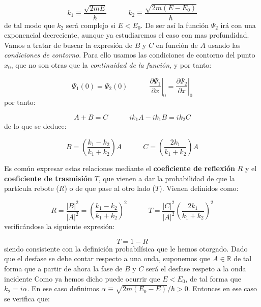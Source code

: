 \documentclass[12pt,a4paper]{article}
\numberwithin{equation}{section}
\numberwithin{figure}{section}
\newcommand{\parentesis}[1]{\left( #1  \right)}
\newcommand{\parciales}[2]{\frac{\partial #1}{\partial #2}}
\newcommand{\tquad}{\quad \quad \quad}
\begin{document}
\begin{equation}
k_1 \equiv \dfrac{\sqrt{2mE}}{\hbar} \tquad k_2 \equiv \dfrac{\sqrt{2m(E-E_0)}}{\hbar}
\end{equation}
de tal modo que $k_2$ será complejo si $E<E_0$. De ser así la función $\Psi_2$ irá con una exponencial decreciente, aunque ya estudiaremos el caso con mas profundidad. Vamos a tratar de buscar la expresión de $B$ y $C$ en función de $A$ usando las \textit{condiciones de contorno}. Para ello usamos las condiciones de contorno del punto $x_0$, que no son otras que la \textit{continuidad de la función}, y por tanto:

\begin{equation}
\Psi_1 (0) = \Psi_2 (0) \tquad \left. \parciales{\Psi_1}{x} \right|_0 = \left. \parciales{\Psi_2}{x} \right|_0
\end{equation}
por tanto:

\begin{equation}
A + B = C \tquad i k_1 A - i k_1 B = i k_2 C
\end{equation}
de lo que se deduce:

\begin{equation}
B = \parentesis{\dfrac{k_1-k_2}{k_1+k_2}}A \tquad C =  \parentesis{\dfrac{2k_1}{k_1+k_2}}A
\end{equation}


Es común expresar estas relaciones mediante el \textbf{coeficiente de reflexión} $R$  y el \textbf{coeficiente de trasmisión}  $T$, que vienen a dar la probabilidad de que la partícula rebote ($R$) o de que pase al otro lado ($T$). Vienen definidos como:

\begin{equation}
R = \dfrac{|B|^2}{|A|^2} = \parentesis{\dfrac{k_1-k_2}{k_1 + k_2}}^2 \tquad T = \dfrac{|C|^2}{|A|^2} \parentesis{\dfrac{2k_1}{k_1 + k_2}}^2 
\end{equation}
verificándose la siguiente expresión:

\begin{equation}
T = 1 - R
\end{equation}
siendo consistente con la definición probabilísica que le hemos otorgado. Dado que el desfase se debe contar respecto a una onda, suponemos que $A \in \mathbb{R}$ de tal forma que a partir de ahora la fase de $B$ y $C$ será el desfase respeto a la onda incidente Como ya hemos dicho puede ocurrir que $E<E_0$, de tal forma que $k_2 =  i \alpha$. En ese caso definimos $\alpha \equiv \sqrt{2m (E_0-E)} / \hbar >0$. Entonces en ese caso se verifica que:
\end{document}
